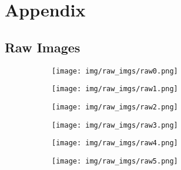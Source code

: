 \newpage
\section*{Appendix}

\subsection*{Raw Images}\label{append1}

\begin{figure}[!htbp]
\begin{subfigure}{.47\textwidth}
  \centering
  \texttt{[image: img/raw\_imgs/raw0.png]}  
  \label{fig:001}
\end{subfigure}
\begin{subfigure}{.47\textwidth}
  \centering
  \texttt{[image: img/raw\_imgs/raw1.png]}  
  \label{fig:002}
\end{subfigure}

\end{figure}

\begin{figure}[!htbp]

\begin{subfigure}{.47\textwidth}
  \centering
  \texttt{[image: img/raw\_imgs/raw2.png]}
  \label{fig:003}
\end{subfigure}
\begin{subfigure}{.47\textwidth}
  \centering
  \texttt{[image: img/raw\_imgs/raw3.png]}  
  \label{fig:004}
\end{subfigure}
  
\end{figure}

\begin{figure}[!htbp]

\begin{subfigure}{.47\textwidth}
  \centering
  \texttt{[image: img/raw\_imgs/raw4.png]}  
  \label{fig:005}
\end{subfigure}
\begin{subfigure}{.47\textwidth}
  \centering
  \texttt{[image: img/raw\_imgs/raw5.png]}  
  \label{fig:006}
\end{subfigure}
\label{005}
\end{figure}

